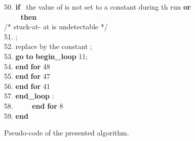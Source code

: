 \documentclass[conference]{IEEEtran} \usepackage{times}
\newcommand{\BL}{\textbf{begin\_loop} }
\newcommand{\END}{\textbf{end} }
\newcommand{\EL}{\textbf{end\_loop} }
\newcommand{\FOR}{\textbf{for} }
\newcommand{\IF}{\textbf{if} }
\newcommand{\OR}{\textbf{or} }
\newcommand{\THEN}{\textbf{then} }
\newcommand{\GO}{\textbf{go} }
\newcommand{\TO}{\textbf{to} }
\begin{document}
\begin{figure}[t!]
\begin{center}
{\begin{tabbing}
50. \> \> \> \> \> \> \IF \ the value of  is not set to a constant during th run \OR \\
 \> \> \> \> \> \> ~~~  \ \THEN \\
\> \> \> \> \> \> \> /* stuck-at- at  is undetectable */ \\
51. \> \> \> \> \> \> \>  ; \\
52. \> \> \> \> \> \> \> replace  by the constant ; \\
53. \> \> \> \> \> \> \> \GO \TO \BL 11; \\

54. \> \> \> \> \END \FOR 48 \\
55. \> \> \> \END \FOR 47 \\ 
56. \> \> \END \FOR 41 \\ 
57. \> \> \EL: \\
58. \> ~~~~ \END \FOR 8 \\ 
59. \END 
\end{tabbing}
}
\caption{Pseudo-code of the presented algorithm.}\label{code} 
\end{center}
\end{figure}
\end{document}
